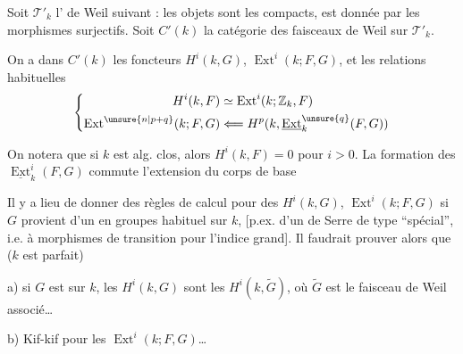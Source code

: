 Soit $\mathcal T'_k$ l' de Weil suivant : les objets sont les
  compacts, 
est donnée par les morphismes  
surjectifs. Soit $C'(k)$ la catégorie des faisceaux de Weil sur $\mathcal T'_k$.


On a dans $C'(k)$ les foncteurs $H^i(k,G)$,
$\operatorname{Ext}^i(k;F,G)$, 
et les relations habituelles
\[
\left\{\begin{aligned}
 H^i(k,F)&\simeq\operatorname{Ext}^i(k;\mathbb Z_k,F)\\
 \operatorname{Ext}^{\unsure{n|p+q}}(k;F,G)&\Longleftarrow
 H^p(k,\underline{\operatorname{Ext}}^{\unsure{q}}_k(F,G))
\end{aligned}\right.
\]

On notera que si $k$ est alg. clos, alors
$H^i(k,F)=0$ pour $i>0$. La formation des
$\underline{\operatorname{Ext}}^i_k(F,G)$ commute 
l'extension du corps de base\unsure{\ldots}

Il y a lieu de  donner des règles de calcul
pour des $H^i(k,G)$, $\operatorname{Ext}^i(k;F,G)$ si $G$ provient d'un
 en groupes habituel sur $k$,
[p.ex. d'un  de Serre de type ``spécial'', i.e. à
morphismes de transition  pour l'indice grand\unsure{\ldots}].
Il faudrait prouver alors que ($k$ est parfait)

\noindent a) si $G$ est  sur $k$, les $H^i(k,G)$ sont les
$H^i(k,\widetilde G)$, où $\widetilde G$ est le faisceau de Weil associé\ldots

\noindent b) Kif-kif pour les $\operatorname{Ext}^i(k;F,G)$\ldots
{}

